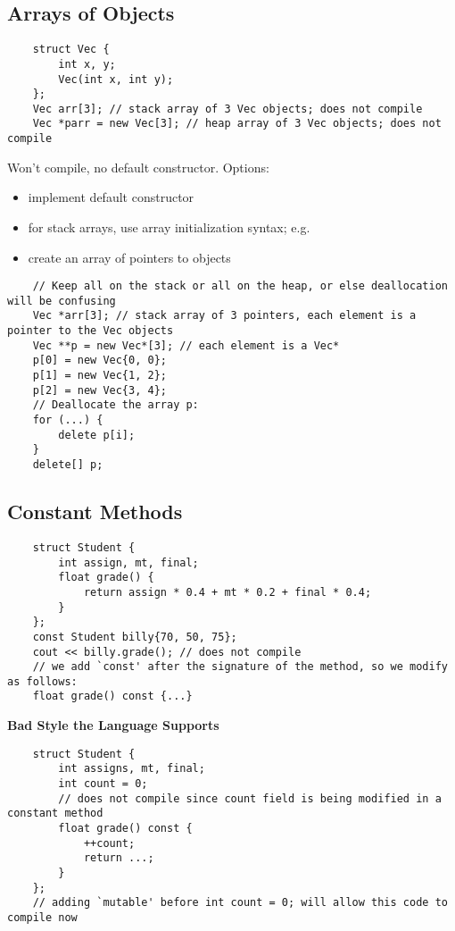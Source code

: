 \subsection{Arrays of Objects}
\begin{lstlisting}
    struct Vec {
        int x, y;
        Vec(int x, int y);
    };
    Vec arr[3]; // stack array of 3 Vec objects; does not compile
    Vec *parr = new Vec[3]; // heap array of 3 Vec objects; does not compile
\end{lstlisting}
Won't compile, no default constructor. Options:
\begin{itemize}
      \item implement default constructor
      \item for stack arrays, use array initialization syntax; e.g.
      \item create an array of pointers to objects
\end{itemize}
\begin{lstlisting}
    // Keep all on the stack or all on the heap, or else deallocation will be confusing
    Vec *arr[3]; // stack array of 3 pointers, each element is a pointer to the Vec objects
    Vec **p = new Vec*[3]; // each element is a Vec*
    p[0] = new Vec{0, 0};
    p[1] = new Vec{1, 2};
    p[2] = new Vec{3, 4};
    // Deallocate the array p:
    for (...) {
        delete p[i];
    }
    delete[] p;
\end{lstlisting}

\subsection{Constant Methods}
\begin{lstlisting}
    struct Student {
        int assign, mt, final;
        float grade() {
            return assign * 0.4 + mt * 0.2 + final * 0.4;
        }
    };
    const Student billy{70, 50, 75};
    cout << billy.grade(); // does not compile
    // we add `const' after the signature of the method, so we modify as follows:
    float grade() const {...}
\end{lstlisting}

\textbf{Bad Style the Language Supports}
\begin{lstlisting}
    struct Student {
        int assigns, mt, final;
        int count = 0;
        // does not compile since count field is being modified in a constant method
        float grade() const {
            ++count;
            return ...;
        }
    };
    // adding `mutable' before int count = 0; will allow this code to compile now
\end{lstlisting}

